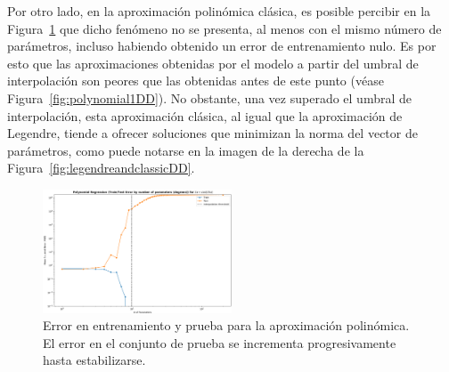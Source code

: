 Por otro lado, en la aproximación polinómica clásica, es posible percibir en la Figura~\ref{fig:OLS1DDD} que dicho fenómeno no se presenta, al menos con el mismo número de parámetros, incluso habiendo obtenido un error de entrenamiento nulo. Es por esto que las aproximaciones obtenidas por el modelo a partir del umbral de interpolación son peores que las obtenidas antes de este punto (véase Figura~\ref{fig:polynomial1DD}). No obstante, una vez superado el umbral de interpolación, esta aproximación clásica, al igual que la aproximación de Legendre, tiende a ofrecer soluciones que minimizan la norma del vector de parámetros, como puede notarse en la imagen de la derecha de la Figura~\ref{fig:legendreandclassicDD}.\newline

\begin{figure}[h]
    \centering
    \includegraphics[width=0.5\textwidth]{img/experiments/OLS1DDD.png}
    \caption[Error en entrenamiento y prueba para la aproximación polinómica.]{Error en entrenamiento y prueba para la aproximación polinómica. El error en el conjunto de prueba se incrementa progresivamente hasta estabilizarse.}\label{fig:OLS1DDD}
\end{figure}


